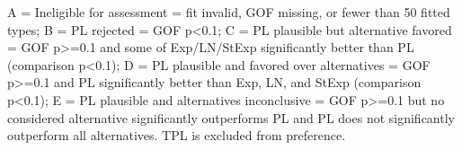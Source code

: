 \begin{flushleft}\footnotesize A = Ineligible for assessment = fit invalid, GOF missing, or fewer than 50 fitted types; B = PL rejected = GOF p<0.1; C = PL plausible but alternative favored = GOF p>=0.1 and some of Exp/LN/StExp significantly better than PL (comparison p<0.1); D = PL plausible and favored over alternatives = GOF p>=0.1 and PL significantly better than Exp, LN, and StExp (comparison p<0.1); E = PL plausible and alternatives inconclusive = GOF p>=0.1 but no considered alternative significantly outperforms PL and PL does not significantly outperform all alternatives. TPL is excluded from preference.\end{flushleft}

